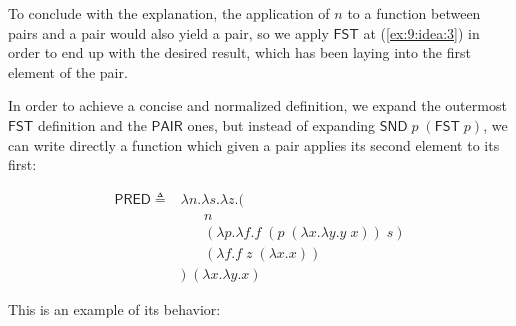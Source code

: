 \documentclass{article}
\begin{document}
To conclude with the explanation, the application of $n$ to a 
function between pairs and a pair would also yield a pair, 
so we apply $\mathsf{FST}$ at (\ref{ex:9:idea:3}) in order to end 
up with the desired result, which has been laying into the first
element of the pair.

In order to achieve a concise and normalized definition, we 
expand the outermost $\mathsf{FST}$ definition and the 
$\mathsf{PAIR}$ ones, but instead of expanding 
$\mathsf{SND}\;p\;(\mathsf{FST}\;p)$, we can write directly a 
function which given a pair applies its second element to its 
first:

\begin{align*}
  \mathsf{PRED} 
    \triangleq
  &\lambda n.\lambda s.\lambda z.( \\
    &\;\;\;\;\;\;n \\
    &\;\;\;\;\;\;(
      \lambda p.\lambda f.f\;(p\;(\lambda x.\lambda y. y\;x))\;s
    ) \\
    &\;\;\;\;\;\;(\lambda f. f\;z\;(\lambda x.x)) \\
  &)\;(\lambda x.\lambda y.x)
\end{align*}

This is an example of its behavior:
\end{document}
